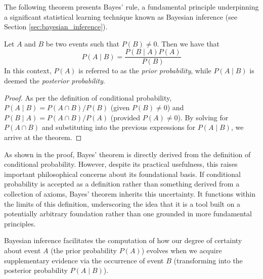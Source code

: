 The following theorem presents Bayes' rule, a fundamental principle underpinning a significant statistical learning technique known as Bayesian inference (see Section \ref{sec:bayesian_inference}). 

\begin{theorem}\label{th:Bayes_theorem} Let $A$ and $B$ be two events such that $P\left( B \right) \neq 0$. Then we have that
\[
P \left( A \mid B \right) = \frac{P \left( B \mid A \right) P \left( A \right)}{P \left( B \right)}
\]
In this context, $P\left( A \right)$ is referred to as the \emph{prior probability}, while $P\left( A \mid B \right)$ is deemed the \emph{posterior probability}.
\end{theorem}
\begin{proof}
As per the definition of conditional probability, $P \left( A \mid B \right) = P \left( A \cap B \right) / P \left( B \right)$ (given $P \left( B \right) \neq 0$) and $P \left( B \mid A \right) = P \left( A \cap B \right) / P \left( A \right)$ (provided $P \left( A \right) \neq 0$). By solving for $P(A\cap B)$ and substituting into the previous expressions for $P(A\mid B)$, we arrive at the theorem.
\end{proof}

As shown in the proof, Bayes' theorem is directly derived from the definition of conditional probability. However, despite its practical usefulness, this raises important philosophical concerns about its foundational basis. If conditional probability is accepted as a definition rather than something derived from a collection of axioms, Bayes' theorem inherits this uncertainty. It functions within the limits of this definition, underscoring the idea that it is a tool built on a potentially arbitrary foundation rather than one grounded in more fundamental principles.

Bayesian inference facilitates the computation of how our degree of certainty about event $A$ (the prior probability $P\left( A \right)$) evolves when we acquire supplementary evidence via the occurrence of event $B$ (transforming into the posterior probability $P\left( A \mid B \right)$).


